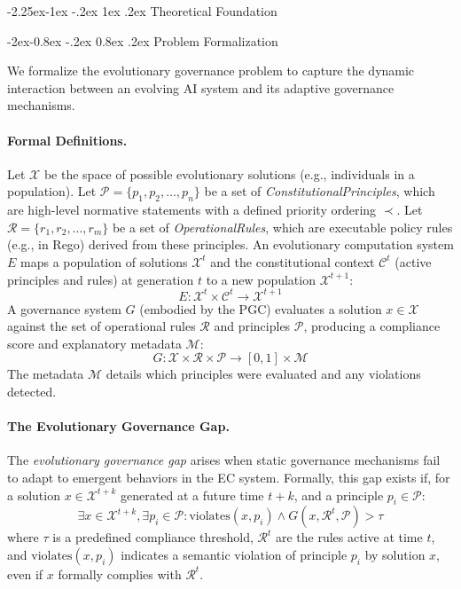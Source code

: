 \documentclass[manuscript,screen,review,anonymous,9pt]{acmart}
\makeatletter
\renewcommand\subsection{\@startsection{subsection}{2}{\z@}%
  {-2.25ex\@plus -1ex \@minus -.2ex}%
  {1ex \@plus .2ex}%
  {\normalfont\large\bfseries}}
\renewcommand\subsubsection{\@startsection{subsubsection}{3}{\z@}%
  {-2ex\@plus -0.8ex \@minus -.2ex}%
  {0.8ex \@plus .2ex}%
  {\normalfont\normalsize\bfseries}}
\makeatother
\begin{document}
\subsection{Theoretical Foundation}
\label{subsec:theoretical_foundation}

\subsubsection{Problem Formalization}
\label{subsubsec:problem_formalization}

We formalize the evolutionary governance problem to capture the dynamic interaction between an evolving AI system and its adaptive governance mechanisms.

\paragraph{Formal Definitions.} Let $\mathcal{X}$ be the space of possible evolutionary solutions (e.g., individuals in a population). Let $\mathcal{P} = \{p_1, p_2, \ldots, p_n\}$ be a set of \textit{ConstitutionalPrinciples}, which are high-level normative statements with a defined priority ordering $\prec$. Let $\mathcal{R} = \{r_1, r_2, \ldots, r_m\}$ be a set of \textit{OperationalRules}, which are executable policy rules (e.g., in Rego) derived from these principles. An evolutionary computation system $E$ maps a population of solutions $\mathcal{X}^t$ and the constitutional context $\mathcal{C}^t$ (active principles and rules) at generation $t$ to a new population $\mathcal{X}^{t+1}$:
\[E: \mathcal{X}^t \times \mathcal{C}^t \rightarrow \mathcal{X}^{t+1}\]
A governance system $G$ (embodied by the PGC) evaluates a solution $x \in \mathcal{X}$ against the set of operational rules $\mathcal{R}$ and principles $\mathcal{P}$, producing a compliance score and explanatory metadata $\mathcal{M}$:
\[G: \mathcal{X} \times \mathcal{R} \times \mathcal{P} \rightarrow [0,1] \times \mathcal{M}\]
The metadata $\mathcal{M}$ details which principles were evaluated and any violations detected.

\paragraph{The Evolutionary Governance Gap.} The \textit{evolutionary governance gap} arises when static governance mechanisms fail to adapt to emergent behaviors in the EC system. Formally, this gap exists if, for a solution $x \in \mathcal{X}^{t+k}$ generated at a future time $t+k$, and a principle $p_i \in \mathcal{P}$:
\[\exists x \in \mathcal{X}^{t+k}, \exists p_i \in \mathcal{P}: \text{violates}(x, p_i) \land G(x, \mathcal{R}^t, \mathcal{P}) > \tau\]
where $\tau$ is a predefined compliance threshold, $\mathcal{R}^t$ are the rules active at time $t$, and $\text{violates}(x, p_i)$ indicates a semantic violation of principle $p_i$ by solution $x$, even if $x$ formally complies with $\mathcal{R}^t$.
\end{document}
